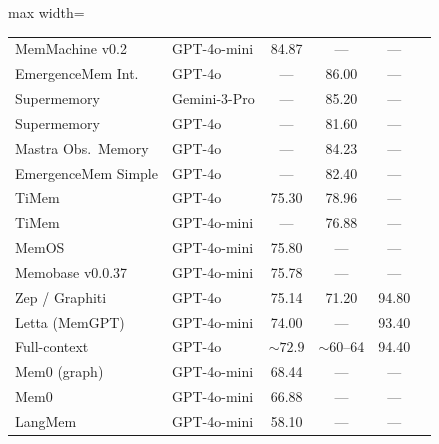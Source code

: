 \begin{table}[!t]
\begin{adjustbox}{max width=\textwidth}
\begin{threeparttable}
\begin{tabular}{@{}llcccl@{}}
MemMachine v0.2      & GPT-4o-mini       & 84.87                & ---             & ---   & \cite{memmachine2025} \\
EmergenceMem Int.    & GPT-4o            & ---                  & 86.00           & ---   & \cite{emergence2025longmemeval} \\
Supermemory          & Gemini-3-Pro      & ---                  & 85.20           & ---   & \cite{supermemory2025} \\
Supermemory          & GPT-4o            & ---                  & 81.60           & ---   & \cite{supermemory2025} \\
Mastra Obs.\ Memory  & GPT-4o            & ---                  & 84.23           & ---   & \cite{mastra2026om} \\
EmergenceMem Simple  & GPT-4o            & ---                  & 82.40           & ---   & \cite{emergence2025longmemeval} \\
TiMem                & GPT-4o            & 75.30                & 78.96           & ---   & \cite{timem2026} \\
TiMem                & GPT-4o-mini       & ---                  & 76.88           & ---   & \cite{timem2026} \\
\midrule
MemOS                & GPT-4o-mini       & 75.80                & ---             & ---   & \cite{memos2025} \\
Memobase v0.0.37     & GPT-4o-mini       & 75.78                & ---             & ---   & \cite{memobase2025,latimer2025hindsight} \\
Zep / Graphiti       & GPT-4o            & 75.14\tnote{d}       & 71.20           & 94.80 & \cite{zep2025,dempsey2025graphiti} \\
Letta (MemGPT)       & GPT-4o-mini       & 74.00                & ---             & 93.40\tnote{e} & \cite{letta2025benchmark,packer2023memgpt} \\
Full-context         & GPT-4o            & ${\sim}72.9$\tnote{f}& ${\sim}60$--64  & 94.40\tnote{e} & \cite{maharana2024locomo,wu2025longmemeval,dempsey2025graphiti} \\
Mem0 (graph)         & GPT-4o-mini       & 68.44                & ---             & ---   & \cite{choudhary2025mem0,latimer2025hindsight} \\
Mem0                 & GPT-4o-mini       & 66.88                & ---             & ---   & \cite{choudhary2025mem0} \\
\midrule
LangMem              & GPT-4o-mini       & 58.10                & ---             & ---   & \cite{latimer2025hindsight} \\

\end{tabular}
\end{threeparttable}
\end{adjustbox}
\end{table}
